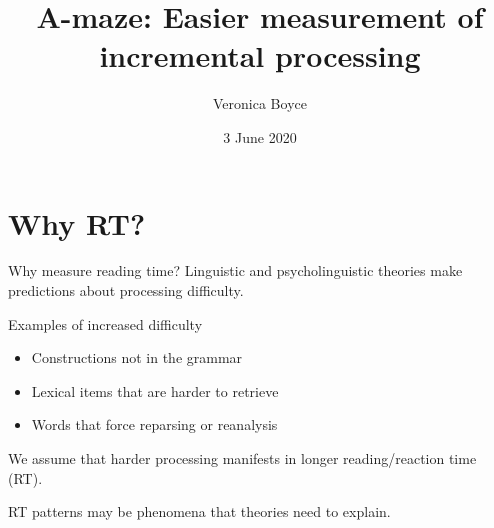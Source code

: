 \documentclass[12pt, xcolor=beamer,table,usenames,dvipsnames, ignorenonframetext, ngerman]{beamer}
\title{A-maze: Easier measurement of incremental processing}
\author{Veronica Boyce}
\date{3 June 2020}
\begin{document}
\begin{frame}
\maketitle
\end{frame}

%

\section{Why RT?}
\begin{frame}{Why measure reading time?}
\pause
Linguistic and psycholinguistic theories make predictions about processing difficulty.
\medskip
\pause

Examples of increased difficulty
\begin{itemize}\pause
	\item Constructions not in the grammar \pause
	\item Lexical items that are harder to retrieve \pause
	\item Words that force reparsing or reanalysis
\end{itemize}
\pause
\medskip 

We assume that harder processing manifests in longer reading/reaction time (RT).
\pause
\medskip

RT patterns may be phenomena that theories need to explain.




\end{frame}
\end{document}
